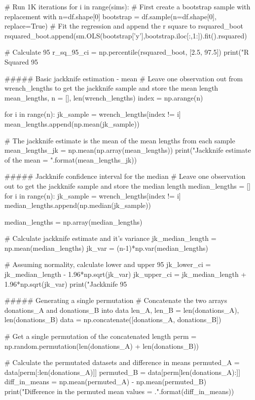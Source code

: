 # Run 1K iterations
for i in range(sims):
    # First create a bootstrap sample with replacement with n=df.shape[0]
    bootstrap = df.sample(n=df.shape[0], replace=True)
    # Fit the regression and append the r square to rsquared_boot
    rsquared_boot.append(sm.OLS(bootstrap['y'],bootstrap.iloc[:,1:]).fit().rsquared)

# Calculate 95%
r_sq_95_ci = np.percentile(rsquared_boot, [2.5, 97.5])
print("R Squared 95%

##### Basic jackknife estimation - mean
# Leave one observation out from wrench_lengths to get the jackknife sample and store the mean length
mean_lengths, n = [], len(wrench_lengths)
index = np.arange(n)

for i in range(n):
    jk_sample = wrench_lengths[index != i]
    mean_lengths.append(np.mean(jk_sample))

# The jackknife estimate is the mean of the mean lengths from each sample
mean_lengths_jk = np.mean(np.array(mean_lengths))
print("Jackknife estimate of the mean = {}".format(mean_lengths_jk))

##### Jackknife confidence interval for the median
# Leave one observation out to get the jackknife sample and store the median length
median_lengths = []
for i in range(n):
    jk_sample = wrench_lengths[index != i]
    median_lengths.append(np.median(jk_sample))

median_lengths = np.array(median_lengths)

# Calculate jackknife estimate and it's variance
jk_median_length = np.mean(median_lengths)
jk_var = (n-1)*np.var(median_lengths)

# Assuming normality, calculate lower and upper 95%
jk_lower_ci = jk_median_length - 1.96*np.sqrt(jk_var)
jk_upper_ci = jk_median_length + 1.96*np.sqrt(jk_var)
print("Jackknife 95%

##### Generating a single permutation
# Concatenate the two arrays donations_A and donations_B into data
len_A, len_B = len(donations_A), len(donations_B)
data = np.concatenate([donations_A, donations_B])

# Get a single permutation of the concatenated length
perm = np.random.permutation(len(donations_A) + len(donations_B))

# Calculate the permutated datasets and difference in means
permuted_A = data[perm[:len(donations_A)]]
permuted_B = data[perm[len(donations_A):]]
diff_in_means = np.mean(permuted_A) - np.mean(permuted_B)
print("Difference in the permuted mean values = {}.".format(diff_in_means))

